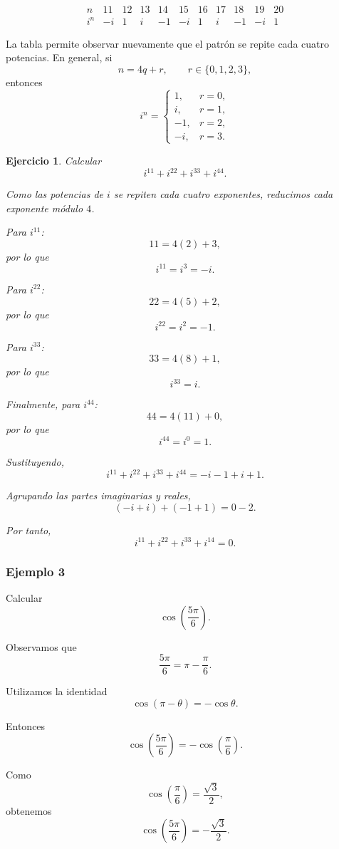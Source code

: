 \documentclass[12pt]{article}
\newtheorem{Ejer}{Ejercicio}
\begin{document}
\[
\begin{array}{c|cccccccccc}
n     &11&12&13&14&15&16&17&18&19&20\\ \hline
i^n   &-i&1&i&-1&-i&1&i&-1&-i&1
\end{array}
\]

La tabla permite observar nuevamente que el patrón se repite cada cuatro
potencias. En general, si
\[
n=4q+r,\qquad r\in\{0,1,2,3\},
\]
entonces
\[
\boxed{
i^n=
\begin{cases}
1, & r=0,\\
i, & r=1,\\
-1, & r=2,\\
-i, & r=3.
\end{cases}
}
\]
\begin{Ejer}

Calcular
\[
i^{11}+i^{22}+i^{33}+i^{44}.
\]

Como las potencias de $i$ se repiten cada cuatro exponentes,
reducimos cada exponente módulo $4$.

Para $i^{11}$:
\[
11=4(2)+3,
\]
por lo que
\[
i^{11}=i^3=-i.
\]

Para $i^{22}$:
\[
22=4(5)+2,
\]
por lo que
\[
i^{22}=i^2=-1.
\]

Para $i^{33}$:
\[
33=4(8)+1,
\]
por lo que
\[
i^{33}=i.
\]

Finalmente, para $i^{44}$:
\[
44=4(11)+0,
\]
por lo que
\[
i^{44}=i^0=1.
\]

Sustituyendo,
\[
i^{11}+i^{22}+i^{33}+i^{44}
=
-i-1+i+1.
\]

Agrupando las partes imaginarias y reales,
\[
(-i+i)+(-1+1)=0-2.
\]

Por tanto,
\[
\boxed{i^{11}+i^{22}+i^{33}+i^{14}=0}.
\]
\end{Ejer}
\subsubsection*{Ejemplo 3}

Calcular
\[
\cos\left(\frac{5\pi}{6}\right).
\]

Observamos que
\[
\frac{5\pi}{6}
=
\pi-\frac{\pi}{6}.
\]

Utilizamos la identidad
\[
\cos(\pi-\theta)=-\cos\theta.
\]

Entonces
\[
\cos\left(\frac{5\pi}{6}\right)
=
-\cos\left(\frac{\pi}{6}\right).
\]

Como
\[
\cos\left(\frac{\pi}{6}\right)=\frac{\sqrt{3}}{2},
\]
obtenemos
\[
\boxed{
\cos\left(\frac{5\pi}{6}\right)
=
-\frac{\sqrt{3}}{2}
}.
\]
\end{document}
